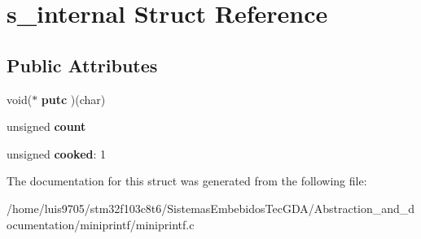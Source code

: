\hypertarget{structs__internal}{}\section{s\+\_\+internal Struct Reference}
\label{structs__internal}
\subsection*{Public Attributes}
\begin{DoxyCompactItemize}
\item 
\mbox{\label{structs__internal_a046caf8bd89d8e15e72d1343200347ec}} 
void($\ast$ {\bfseries putc} )(char)
\item 
\mbox{\label{structs__internal_aa5f781ae7e2d8c24589aa3baa43eaeec}} 
unsigned {\bfseries count}
\item 
\mbox{\label{structs__internal_a8b552ee95b8f39562944aa3b19de3a85}} 
unsigned {\bfseries cooked}\+: 1
\end{DoxyCompactItemize}


The documentation for this struct was generated from the following file\+:\begin{DoxyCompactItemize}
\item 
/home/luis9705/stm32f103c8t6/\+Sistemas\+Embebidos\+Tec\+G\+D\+A/\+Abstraction\+\_\+and\+\_\+documentation/miniprintf/miniprintf.\+c\end{DoxyCompactItemize}

